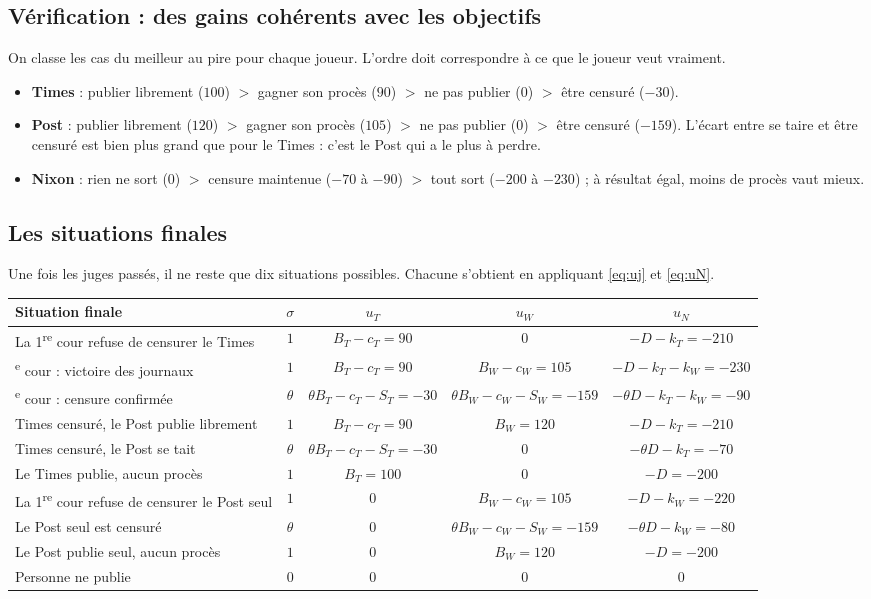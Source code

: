 \documentclass[11pt,a4paper]{article}
\theoremstyle{definition}
\begin{document}
\subsection{Vérification : des gains cohérents avec les objectifs}
On classe les cas du meilleur au pire pour chaque joueur. L'ordre doit correspondre à ce que le joueur veut vraiment.
\begin{itemize}[leftmargin=*,itemsep=1pt]
\item \textbf{Times} : publier librement ($100$) $>$ gagner son procès ($90$) $>$ ne pas publier ($0$) $>$ être censuré ($-30$).
\item \textbf{Post} : publier librement ($120$) $>$ gagner son procès ($105$) $>$ ne pas publier ($0$) $>$ être censuré ($-159$). L'écart entre se taire et être censuré est bien plus grand que pour le Times : c'est le Post qui a le plus à perdre.
\item \textbf{Nixon} : rien ne sort ($0$) $>$ censure maintenue ($-70$ à $-90$) $>$ tout sort ($-200$ à $-230$) ; à résultat égal, moins de procès vaut mieux.
\end{itemize}

\subsection{Les situations finales}
Une fois les juges passés, il ne reste que dix situations possibles. Chacune s'obtient en appliquant \eqref{eq:uj} et \eqref{eq:uN}.
\begin{center}
\footnotesize
\begin{tabularx}{\textwidth}{@{}>{\raggedright\arraybackslash}Xcccc@{}}
\toprule
Situation finale & $\sigma$ & $u_T$ & $u_W$ & $u_N$ \\
\midrule
La 1\textsuperscript{re} cour refuse de censurer le Times & $1$ & $B_T-c_T=90$ & $0$ & $-D-k_T=-210$ \\
2\textsuperscript{e} cour : victoire des journaux & $1$ & $B_T-c_T=90$ & $B_W-c_W=105$ & $-D-k_T-k_W=-230$ \\
2\textsuperscript{e} cour : censure confirmée & $\theta$ & $\theta B_T-c_T-S_T=-30$ & $\theta B_W-c_W-S_W=-159$ & $-\theta D-k_T-k_W=-90$ \\
Times censuré, le Post publie librement & $1$ & $B_T-c_T=90$ & $B_W=120$ & $-D-k_T=-210$ \\
Times censuré, le Post se tait & $\theta$ & $\theta B_T-c_T-S_T=-30$ & $0$ & $-\theta D-k_T=-70$ \\
Le Times publie, aucun procès & $1$ & $B_T=100$ & $0$ & $-D=-200$ \\
La 1\textsuperscript{re} cour refuse de censurer le Post seul & $1$ & $0$ & $B_W-c_W=105$ & $-D-k_W=-220$ \\
Le Post seul est censuré & $\theta$ & $0$ & $\theta B_W-c_W-S_W=-159$ & $-\theta D-k_W=-80$ \\
Le Post publie seul, aucun procès & $1$ & $0$ & $B_W=120$ & $-D=-200$ \\
Personne ne publie & $0$ & $0$ & $0$ & $0$ \\
\bottomrule
\end{tabularx}
\end{center}
\end{document}
